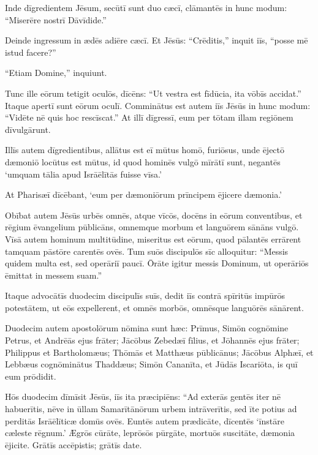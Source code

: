 \Versus Inde dīgredientem Jēsum, secūtī sunt duo cæcī, clāmantēs in hunc modum: ``Miserēre nostrī Dāvīdide.'' 

\Versus Deinde ingressum in ædēs adiēre cæcī. Et Jēsūs: ``Crēditis,'' inquit iīs, ``posse mē istud facere?''

``Etiam Domine,'' inquiunt. 

\Versus Tunc ille eōrum tetigit oculōs, dīcēns: ``Ut vestra est fīdūcia, ita vōbīs accidat.'' 
\Versus Itaque apertī sunt eōrum oculī. Comminātus est autem iīs Jēsūs in hunc modum: ``Vidēte nē quis hoc rescīscat.'' 
\Versus At illī dīgressī, eum per tōtam illam regiōnem dīvul\-gārunt.

\Versus Illīs autem dīgredientibus, allātus est eī mūtus homō, furiōsus, 
\Versus unde ējectō dæmoniō locūtus est mūtus, id quod hominēs vulgō mīrātī sunt, negantēs `umquam tālia apud Isrāēlītās fuisse vīsa.'

\Versus At Pharisæī dīcēbant, `eum per dæmoniōrum prīncipem ējicere dæmonia.'

\Versus Obībat autem Jēsūs urbēs omnēs, atque vīcōs, docēns in eōrum conventibus, et rēgium ēvangelium pūblicāns, omnemque morbum et languōrem sānāns vulgō. 
\Versus Vīsā autem hominum multitūdine, miseritus est eōrum, quod pālantēs errārent tamquam pāstōre carentēs ovēs. 
\Versus Tum suōs discipulōs sīc alloquitur: ``Messis quidem multa est, sed operāriī paucī. 
\Versus Ōrāte igitur messis Dominum, ut operāriōs ēmittat in messem suam.''


\Caput
\Versus Itaque advocātīs duodecim discipulīs suīs, dedit iīs contrā spīritūs impūrōs potestātem, ut eōs expellerent, et omnēs morbōs, omnēsque languōrēs sānārent. 

\Versus Duodecim autem apostolōrum nōmina sunt hæc: Prīmus, Simōn cognōmine Petrus, et Andrēās ejus frāter; Jācōbus Zebedæī fīlius, et Jōhannēs ejus frāter;
\Versus Philippus et Bartholomæus; Thōmās et Matthæus pūblicānus; Jācōbus Alphæī, et Lebbæus cognōmi\-nātus Thaddæus;
\Versus Simōn Cananīta, et Jūdās Iscariōta, is quī eum prōdidit.

\Versus Hōs duodecim dīmīsit Jēsūs, iīs ita præcipiēns: ``Ad exterās gentēs iter nē habuerītis, nēve in ūllam Samarītānōrum urbem intrāverītis, 
\Versus sed īte potius ad perditās Isrāēlīticæ domūs ovēs. 
\Versus Euntēs autem prædicāte, dīcentēs `īnstāre cæleste rēgnum.' 
\Versus Ægrōs cūrāte, leprōsōs pūrgāte, mortuōs suscitāte, dæmonia ējicite. Grātīs accēpistis; grātīs date.

